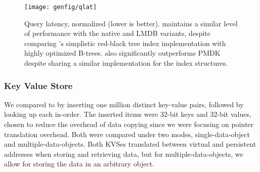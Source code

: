 \begin{figure}
    \centering
    \texttt{[image: genfig/qlat]}
    \caption{Query latency, normalized (lower is better). \Twizzler maintains a similar level of
        performance with the native and LMDB variants, despite comparing \Twizzler's simplistic
        red-black tree index
        implementation with highly optimized B-trees. \Twizzler also significantly outperforms PMDK
        despite sharing a similar implementation for the index structures.}
    \label{fig:qlat}
\end{figure}


\subsubsection{Key Value Store}
\label{sec:kvperf}

We compared \nvkv to \unixkv
by inserting one
million distinct key-value pairs, followed by looking up each in-order. The inserted items were 32-bit
keys and 32-bit values, chosen to reduce the overhead of data copying since we were focusing on
pointer translation overhead.
Both were
compared under two modes, single-data-object and multiple-data-objects. Both KVSes translated
between virtual and persistent addresses when storing and retrieving data, but for
multiple-data-objects, we allow for storing the data in an arbitrary object.

